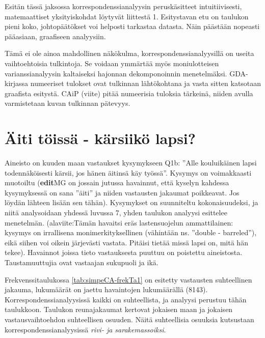\documentclass[
  finnish,
]{book}
\begin{document}
Esitän tässä jaksossa korrespondenssianalyysin peruskäsitteet intuitiivisesti,
matemaattiset yksityiskohdat löytyvät liittestä 1. Esitystavan etu on taulukon
pieni koko, johtopäätökset voi helposti tarkastaa datasta.
Näin päästään nopeasti pääasiaan, graafiseen analyysiin.

Tämä ei ole ainoa mahdollinen näkökulma, korrespondenssianalyysillä on useita
vaihtoehtoisia tulkintoja. Se voidaan ymmärtää myös moniulotteisen
varianssianalyysin kaltaiseksi hajonnan dekomponoinnin menetelmäksi.
GDA-kirjassa numeeriset tulokset ovat tulkinnan lähtökohtana ja vasta sitten
katsotaan graafista esitystä. CAiP (viite) pitää numeerisia tuloksia tärkeinä,
niiden avulla varmistetaan kuvan tulkinnan pätevyys.

\hypertarget{uxe4iti-tuxf6issuxe4---kuxe4rsiikuxf6-lapsi}{%
\section{Äiti töissä - kärsiikö lapsi?}\label{uxe4iti-tuxf6issuxe4---kuxe4rsiikuxf6-lapsi}}

Aineisto on kuuden maan vastaukset kysymykseen Q1b: ''Alle kouluikäinen lapsi
todennäköisesti kärsii, jos hänen äitinsä käy työssä''. Kysymys on voimakkaasti
muotoiltu (\textbf{edit}MG on jossain jutussa havainnut, että kyselyn kahdessa
kysymyksessä on sana ''äiti'' ja niiden vastausten jakaumat poikkeavat. Jos löydän
lähteen lisään sen tähän). Kysymykset on suunniteltu kokonaisuudeksi, ja niitä
analysoidaan yhdessä luvussa 7, yhden taulukon analyysi esittelee menetelmän.
(alaviite:Tämän havaitsi eräs lastensuojelun ammattilainen: kysymys on
irrallisena monimerkityksellinen (vähintään ns. ''double - barreled''), eikä
siihen voi oikein järjevästi vastata. Pitäisi tietää missä lapsi on, mitä hän
tekee). Havainnot joissa tieto vastauksesta puuttuu on poistettu aineistosta.
Taustamuuttujia ovat vastaajan sukupuoli ja ikä.

Frekvenssitaulukossa \ref{tab:simpeCA-frekTa1} on esitetty vastausten suhteellinen jakauma,
lukumäärät on jaettu havaintojen lukumäärällä (8143). Korrespondenssianalyysissä
kaikki on suhteellista, ja analyysi perustuu tähän taulukkoon. Taulukon
reunajakaumat kertovat jokaisen maan ja jokaisen vastausvaihtoehdon suhteellisen
osuuden. Näitä suhteellisia osuuksia kutsustaan korrespondenssianalyysissä
\emph{rivi- ja sarakemassoiksi}.
\end{document}

